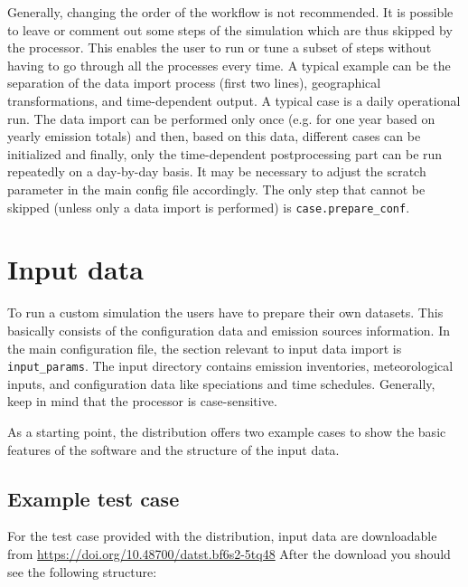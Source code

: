 \documentclass[a4paper,11pt]{article}
\begin{document}
Generally, changing the order of the workflow is not recommended.
It is possible to leave or comment out some
steps of the simulation which are thus skipped by the processor. This
enables the user to run or tune a subset of steps without having to go through all
the processes every time. A typical example can be the separation of the data import process (first two lines), geographical transformations, and time-dependent output. A typical case is a daily operational run. The data import can be performed only once (e.g. for one year based on yearly emission totals) and then, based on this data, different cases can be initialized and finally, only the time-dependent postprocessing part can be run repeatedly on a day-by-day basis. It may be necessary to adjust the scratch parameter in the main config file accordingly. The only step that cannot be skipped (unless only a data import is performed) is \verb|case.prepare_conf|.

\section{Input data}\label{input-data}
To run a custom simulation the users have to prepare their own datasets. This basically consists of the configuration data and emission sources information. In the main configuration file, the section relevant to input data import is \verb|input_params|. The input directory contains emission inventories, meteorological inputs, and configuration data like speciations and time schedules. Generally, keep in mind that the processor is case-sensitive.

As a starting point, the distribution offers two example cases to show the basic features of the software and the structure of the input data.

\subsection{Example test case}\label{example-test-case}
For the test case provided with the distribution, input data are
downloadable from \url{https://doi.org/10.48700/datst.bf6s2-5tq48} After the download you should see the
following structure:
\end{document}
